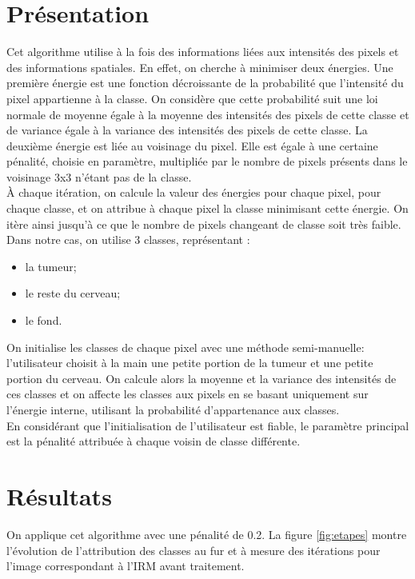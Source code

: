 \section{Présentation}
	Cet algorithme utilise à la fois des informations liées aux intensités des pixels et des informations spatiales. En effet, on cherche à minimiser deux énergies. Une première énergie est une fonction décroissante de la probabilité que l'intensité du pixel appartienne à la classe. On considère que cette probabilité suit une loi normale de moyenne égale à la moyenne des intensités des pixels de cette classe et de variance égale à la variance des intensités des pixels de cette classe. La deuxième énergie est liée au voisinage du pixel. Elle est égale à une certaine pénalité, choisie en paramètre, multipliée par le nombre de pixels présents dans le voisinage 3x3 n'étant pas de la classe.\\

	À chaque itération, on calcule la valeur des énergies pour chaque pixel, pour chaque classe, et on attribue à chaque pixel la classe minimisant cette énergie. On itère ainsi jusqu'à ce que le nombre de pixels changeant de classe soit très faible.\\

	Dans notre cas, on utilise 3 classes, représentant :

	\begin{itemize}
		\item la tumeur;
		\item le reste du cerveau;
		\item le fond.
	\end{itemize}
	\bigskip

	On initialise les classes de chaque pixel avec une méthode semi-manuelle: l'utilisateur choisit à la main une petite portion de la tumeur et une petite portion du cerveau. On calcule alors la moyenne et la variance des intensités de ces classes et on affecte les classes aux pixels en se basant uniquement sur l'énergie interne, utilisant la probabilité d'appartenance aux classes.\\

	En considérant que l'initialisation de l'utilisateur est fiable, le paramètre principal est la pénalité attribuée à chaque voisin de classe différente.

\section{Résultats}
	On applique cet algorithme avec une pénalité de 0.2. La figure \ref{fig:etapes} montre l'évolution de l'attribution des classes au fur et à mesure des itérations pour l'image correspondant à l'IRM avant traitement. 

